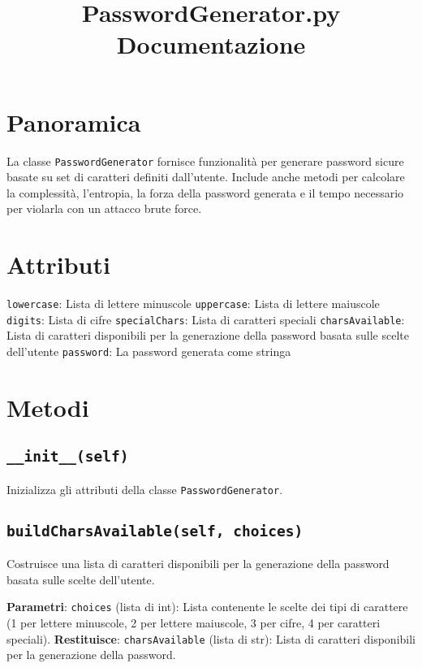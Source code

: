 \documentclass{article}
\title{PasswordGenerator.py \\ \large Documentazione}
\author{}
\date{}
\begin{document}
    
    \maketitle

    \section*{Panoramica}
        La classe \texttt{PasswordGenerator} fornisce funzionalità per generare password sicure basate su set di caratteri definiti dall'utente. Include anche metodi per calcolare la complessità, l'entropia, la forza della password generata e il tempo necessario per violarla con un attacco brute force.

    \section*{Attributi}
        \begin{outline}
            \1 \texttt{lowercase}: Lista di lettere minuscole
            \1 \texttt{uppercase}: Lista di lettere maiuscole
            \1 \texttt{digits}: Lista di cifre
            \1 \texttt{specialChars}: Lista di caratteri speciali
            \1 \texttt{charsAvailable}: Lista di caratteri disponibili per la generazione della password basata sulle scelte dell'utente
            \1 \texttt{password}: La password generata come stringa
        \end{outline}

    \section*{Metodi}
        \subsection*{\texttt{\_\_init\_\_(self)}}
            Inizializza gli attributi della classe \texttt{PasswordGenerator}.
        
        \subsection*{\texttt{buildCharsAvailable(self, choices)}}
            Costruisce una lista di caratteri disponibili per la generazione della password basata sulle scelte dell'utente.
            \begin{outline}
                \1 \textbf{Parametri}:
                    \2 \texttt{choices} (lista di int): Lista contenente le scelte dei tipi di carattere (1 per lettere minuscole, 2 per lettere maiuscole, 3 per cifre, 4 per caratteri speciali).
                \1 \textbf{Restituisce}:
                    \2 \texttt{charsAvailable} (lista di str): Lista di caratteri disponibili per la generazione della password.
            \end{outline}
        
\end{document}
